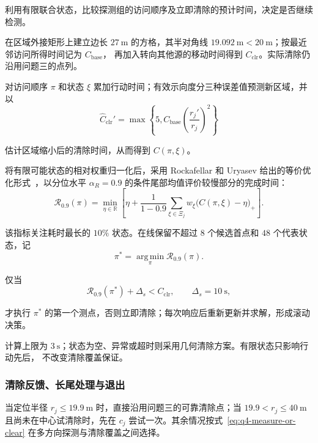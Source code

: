 利用有限联合状态，比较探测组的访问顺序及立即清除的预计时间，决定是否继续检测。

在区域外接矩形上建立边长 $27\ \mathrm m$ 的方格，其半对角线
$19.092\ \mathrm m<20\ \mathrm m$；按最近邻访问所得时间记为 $C_{\mathrm{base}}$，
再加入转向其他源的移动时间得到 $C_{\mathrm{clr}}$。实际清除仍沿用问题三的点列。

对访问顺序 $\pi$ 和状态 $\xi$ 累加行动时间；有效示向度分三种误差值预测新区域，并以
\begin{equation}
  \widehat C_{\mathrm{clr}}'
  =\max\left\{5,
  C_{\mathrm{base}}
  \left(\frac{r_j'}{r_j}\right)^2\right\}
  \label{eq:q4-clear-cost-scale}
\end{equation}

估计区域缩小后的清除时间，从而得到 $C(\pi,\xi)$。

将有限可能状态的相对权重归一化后，采用 Rockafellar 和 Uryasev 给出的等价优化形式~\cite{rockafellar2000}，以分位水平 $\alpha_R=0.9$ 的条件尾部均值评价较慢部分的完成时间：
\begin{equation}
  \mathcal R_{0.9}(\pi)
  =\min_{\eta\in\mathbb R}
  \left[
    \eta+\frac{1}{1-0.9}
    \sum_{\xi\in\Xi_j}w_\xi
    \bigl(C(\pi,\xi)-\eta\bigr)_+
  \right].
  \label{eq:q4-cvar}
\end{equation}

该指标关注耗时最长的 $10\%$ 状态。在线保留不超过 $8$ 个候选首点和 $48$ 个代表状态，记
\begin{equation}
  \pi^*=\operatorname*{arg\,min}_{\pi}\mathcal R_{0.9}(\pi).
\end{equation}

仅当
\begin{equation}
  \mathcal R_{0.9}(\pi^*)+\Delta_s<C_{\mathrm{clr}},
  \qquad \Delta_s=10\ \mathrm{s},
  \label{eq:q4-measure-or-clear}
\end{equation}

才执行 $\pi^*$ 的第一个测点，否则立即清除；每次响应后重新更新并求解，形成滚动决策。

计算上限为 $3\ \mathrm s$；状态为空、异常或超时则采用几何清除方案。有限状态只影响行动先后，
不改变清除覆盖保证。

\subsubsection{清除反馈、长尾处理与退出}

当定位半径 $r_j\leq19.9\ \mathrm{m}$ 时，直接沿用问题三的可靠清除点；当 $19.9<r_j\leq40\ \mathrm{m}$ 且尚未在中心试清除时，先在 $c_j$ 尝试一次。其余情况按式~\eqref{eq:q4-measure-or-clear} 在多方向探测与清除覆盖之间选择。

